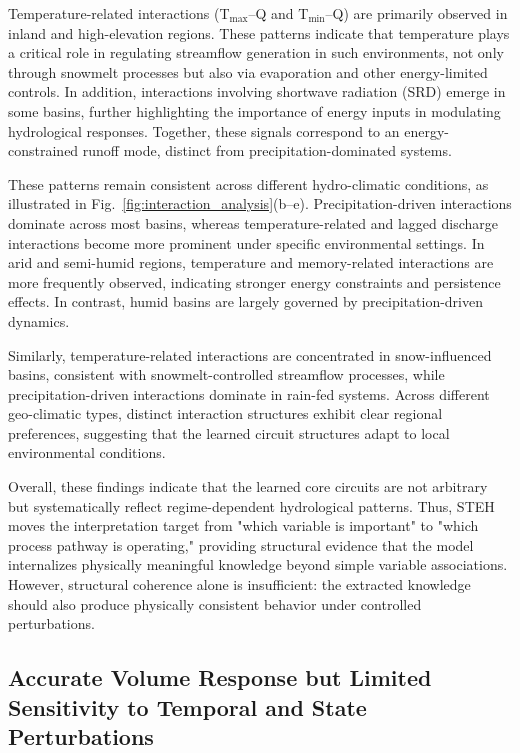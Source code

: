 Temperature-related interactions (T$_{\max}$--Q and T$_{\min}$--Q) are primarily observed in inland and high-elevation regions. These patterns indicate that temperature plays a critical role in regulating streamflow generation in such environments, not only through snowmelt processes but also via evaporation and other energy-limited controls\cite{milly2020colorado}. In addition, interactions involving shortwave radiation (SRD) emerge in some basins, further highlighting the importance of energy inputs\cite{immerzeel2010climate} in modulating hydrological responses. Together, these signals correspond to an energy-constrained runoff mode, distinct from precipitation-dominated systems.

These patterns remain consistent across different hydro-climatic conditions, as illustrated in Fig.~\ref{fig:interaction_analysis}(b--e). Precipitation-driven interactions dominate across most basins, whereas temperature-related and lagged discharge interactions become more prominent under specific environmental settings. In arid and semi-humid regions, temperature and memory-related interactions are more frequently observed\cite{milly2020colorado}, indicating stronger energy constraints and persistence effects. In contrast, humid basins are largely governed by precipitation-driven dynamics\cite{Berghuijs2014}.

Similarly, temperature-related interactions\cite{immerzeel2010climate} are concentrated in snow-influenced basins, consistent with snowmelt-controlled streamflow processes, while precipitation-driven interactions dominate in rain-fed systems\cite{Wrr_p_q}. Across different geo-climatic types, distinct interaction structures exhibit clear regional preferences, suggesting that the learned circuit structures adapt to local environmental conditions.

Overall, these findings indicate that the learned core circuits are not arbitrary but systematically reflect regime-dependent hydrological patterns\cite{hess-24-1081-2020}. Thus, STEH moves the interpretation target from "which variable is important" to "which process pathway is operating," providing structural evidence that the model internalizes physically meaningful knowledge beyond simple variable associations. However, structural coherence alone is insufficient: the extracted knowledge should also produce physically consistent behavior under controlled perturbations.

\subsection{Accurate Volume Response but Limited Sensitivity to Temporal and State Perturbations}

